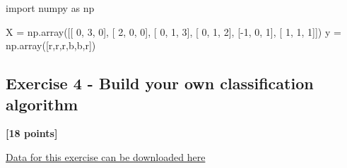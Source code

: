 \documentclass[
  letterpaper,
  DIV=11,
  numbers=noendperiod]{scrartcl}
\newenvironment{Shaded}{\begin{snugshade}}{\end{snugshade}}
\newcommand{\DecValTok}[1]{\textcolor[rgb]{0.68,0.00,0.00}{#1}}
\newcommand{\ImportTok}[1]{\textcolor[rgb]{0.00,0.46,0.62}{#1}}
\newcommand{\NormalTok}[1]{\textcolor[rgb]{0.00,0.23,0.31}{#1}}
\newcommand{\OperatorTok}[1]{\textcolor[rgb]{0.37,0.37,0.37}{#1}}
\newcommand{\StringTok}[1]{\textcolor[rgb]{0.13,0.47,0.30}{#1}}
\begin{document}
\begin{Shaded}
\begin{Highlighting}[]
\ImportTok{import}\NormalTok{ numpy }\ImportTok{as}\NormalTok{ np}

\NormalTok{X }\OperatorTok{=}\NormalTok{ np.array([[ }\DecValTok{0}\NormalTok{, }\DecValTok{3}\NormalTok{, }\DecValTok{0}\NormalTok{],}
\NormalTok{              [ }\DecValTok{2}\NormalTok{, }\DecValTok{0}\NormalTok{, }\DecValTok{0}\NormalTok{],}
\NormalTok{              [ }\DecValTok{0}\NormalTok{, }\DecValTok{1}\NormalTok{, }\DecValTok{3}\NormalTok{],}
\NormalTok{              [ }\DecValTok{0}\NormalTok{, }\DecValTok{1}\NormalTok{, }\DecValTok{2}\NormalTok{],}
\NormalTok{              [}\OperatorTok{{-}}\DecValTok{1}\NormalTok{, }\DecValTok{0}\NormalTok{, }\DecValTok{1}\NormalTok{],}
\NormalTok{              [ }\DecValTok{1}\NormalTok{, }\DecValTok{1}\NormalTok{, }\DecValTok{1}\NormalTok{]])}
\NormalTok{y }\OperatorTok{=}\NormalTok{ np.array([}\StringTok{\textquotesingle{}r\textquotesingle{}}\NormalTok{,}\StringTok{\textquotesingle{}r\textquotesingle{}}\NormalTok{,}\StringTok{\textquotesingle{}r\textquotesingle{}}\NormalTok{,}\StringTok{\textquotesingle{}b\textquotesingle{}}\NormalTok{,}\StringTok{\textquotesingle{}b\textquotesingle{}}\NormalTok{,}\StringTok{\textquotesingle{}r\textquotesingle{}}\NormalTok{])}
\end{Highlighting}
\end{Shaded}

\subsection{Exercise 4 - Build your own classification
algorithm}\label{exercise-4---build-your-own-classification-algorithm}

\textbf{{[}18 points{]}}

\begin{tcolorbox}[enhanced jigsaw, coltitle=black, title=\textcolor{quarto-callout-note-color}{\faInfo}\hspace{0.5em}{Note}, opacitybacktitle=0.6, bottomtitle=1mm, bottomrule=.15mm, opacityback=0, breakable, rightrule=.15mm, colback=white, colframe=quarto-callout-note-color-frame, colbacktitle=quarto-callout-note-color!10!white, titlerule=0mm, toprule=.15mm, toptitle=1mm, arc=.35mm, leftrule=.75mm, left=2mm]

\href{https://github.com/kylebradbury/ids705/tree/main/notebooks/data/a2}{Data
for this exercise can be downloaded here}

\end{tcolorbox}
\end{document}
